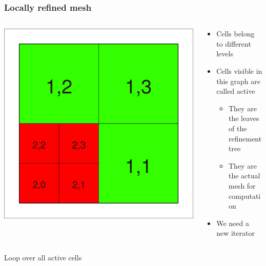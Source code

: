 \begin{frame}
  \frametitle{Locally refined mesh}
  \begin{columns}
    \begin{column}{.4\textwidth}
      \includegraphics[width=\textwidth]{graph/step1-1c}
    \end{column}
    \begin{column}{.6\textwidth}
      \begin{itemize}
      \item Cells belong to different levels
        \item Cells visible in this graph are called active
          \begin{itemize}
          \item They are the leaves of the refinement tree
          \item They are the actual mesh for computation
          \end{itemize}
      \item We need a new iterator
      \end{itemize}
    \end{column}
  \end{columns}
  \pause
  \begin{block}{Loop over all active cells}
      
  \end{block}
\end{frame}

